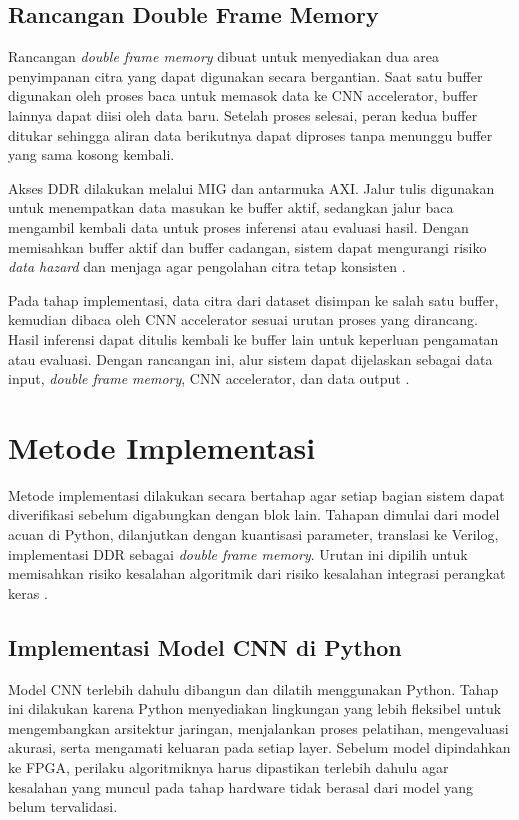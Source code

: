     \subsection{Rancangan Double Frame Memory}
	Rancangan \emph{double frame memory} dibuat untuk menyediakan dua area
	penyimpanan citra yang dapat digunakan secara bergantian. Saat satu buffer
	digunakan oleh proses baca untuk memasok data ke CNN accelerator, buffer
	lainnya dapat diisi oleh data baru. Setelah proses selesai, peran kedua
	buffer ditukar sehingga aliran data berikutnya dapat diproses tanpa
	menunggu buffer yang sama kosong kembali.

	Akses DDR dilakukan melalui MIG dan antarmuka AXI. Jalur tulis digunakan
	untuk menempatkan data masukan ke buffer aktif, sedangkan jalur baca
	mengambil kembali data untuk proses inferensi atau evaluasi hasil. Dengan
	memisahkan buffer aktif dan buffer cadangan, sistem dapat mengurangi risiko
	\emph{data hazard} dan menjaga agar pengolahan citra tetap konsisten
	\cite{ARM2020AXI,Xilinx2024MIG}.

	Pada tahap implementasi, data citra dari dataset disimpan ke salah satu
	buffer, kemudian dibaca oleh CNN accelerator sesuai urutan proses yang
	dirancang. Hasil inferensi dapat ditulis kembali ke buffer lain untuk
	keperluan pengamatan atau evaluasi. Dengan rancangan ini, alur sistem dapat
	dijelaskan sebagai data input, \emph{double frame memory}, CNN accelerator,
	dan data output \cite{Solovyev2019FixedPointCNN}.

\section{Metode Implementasi}
Metode implementasi dilakukan secara bertahap agar setiap bagian sistem dapat
diverifikasi sebelum digabungkan dengan blok lain. Tahapan dimulai dari model
acuan di Python, dilanjutkan dengan kuantisasi parameter, translasi ke Verilog,
implementasi DDR sebagai \emph{double frame memory}. Urutan ini dipilih untuk
memisahkan risiko kesalahan algoritmik dari risiko kesalahan integrasi
perangkat keras \cite{Solovyev2019FixedPointCNN,Jacob2018Quantization}.

    \subsection{Implementasi Model CNN di Python}
	Model CNN terlebih dahulu dibangun dan dilatih menggunakan Python. Tahap ini
	dilakukan karena Python menyediakan lingkungan yang lebih fleksibel untuk
	mengembangkan arsitektur jaringan, menjalankan proses pelatihan, mengevaluasi
	akurasi, serta mengamati keluaran pada setiap layer. Sebelum model dipindahkan
	ke FPGA, perilaku algoritmiknya harus dipastikan terlebih dahulu agar
	kesalahan yang muncul pada tahap hardware tidak berasal dari model yang belum
	tervalidasi.

